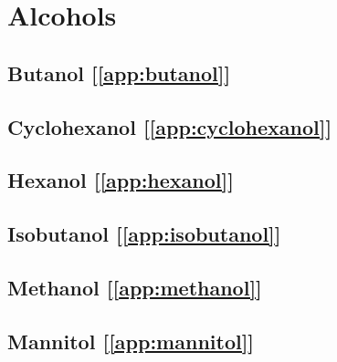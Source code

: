 \chapter{Alcohols}\label{sec:alcohols}
\section{Butanol [\ref{app:butanol}]}\label{sec:butanol}

\section{Cyclohexanol [\ref{app:cyclohexanol}]}\label{sec:cyclohexanol}

\section{Hexanol [\ref{app:hexanol}]}\label{sec:hexanol}

\section{Isobutanol [\ref{app:isobutanol}]}\label{sec:isobutanol}

\section{Methanol [\ref{app:methanol}]}\label{sec:methanol}

\section{Mannitol [\ref{app:mannitol}]}\label{sec:mannitol}

